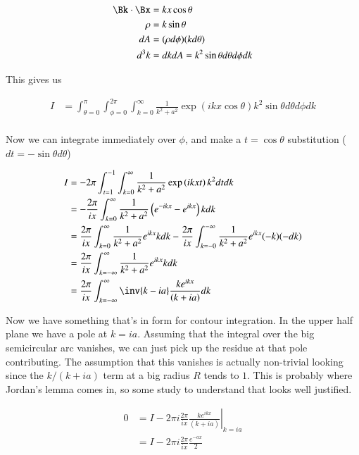 \begin{align*}
\Bk \cdot \Bx &= k x \cos\theta \\
\rho &= k \sin\theta \\
dA &= (\rho d\phi)(k d\theta) \\
d^3 k &= dk dA = k^2 \sin\theta d\theta d\phi dk \\
\end{align*}

This gives us

\begin{align*}
I &= \int_{\theta=0}^{\pi} \int_{\phi=0}^{2\pi} \int_{k=0}^\infty \frac{1}{k^2 + a^2} \exp\left( i k x \cos\theta \right)
k^2 \sin\theta d\theta d\phi dk \\
\end{align*}

Now we can integrate immediately over $\phi$, and make a $t = \cos\theta$ substitution ($dt = -\sin\theta d\theta$)

\begin{align*}
I
&= - 2\pi \int_{t=1}^{-1} \int_{k=0}^\infty \frac{1}{k^2 + a^2} \exp\left( i k x t \right) k^2 dt dk \\
&= - \frac{2\pi}{ix} \int_{k=0}^\infty \frac{1}{k^2 + a^2}
\left(
e^{-i k x } -e^{i k x }
\right)
k dk \\
&= \frac{2\pi}{ix} \int_{k=0}^\infty \frac{1}{k^2 + a^2}
e^{i k x }
k dk
- \frac{2\pi}{ix} \int_{k=-0}^{-\infty} \frac{1}{k^2 + a^2}
e^{i k x }
(-k) (-dk) \\
&= \frac{2\pi}{ix} \int_{k=-\infty}^\infty \frac{1}{k^2 + a^2} e^{i k x } k dk \\
&= \frac{2\pi}{ix} \int_{k=-\infty}^\infty \inv{k - ia} \frac{ k e^{ i k x } }{(k + ia)} dk \\
\end{align*}

Now we have something that's in form for contour integration.  In the upper half plane we have a pole at $k= ia$.  Assuming that the
integral over the big semicircular arc vanishes, we can just pick up the residue at that pole contributing.  The assumption that
this vanishes is actually non-trivial looking since the $k/(k+ia)$ term at a big radius $R$ tends to $1$.  This is probably where
Jordan's lemma comes in, so some study to understand that looks well justified.

\begin{align*}
0
&= I - 2 \pi i {\left. \frac{2\pi}{ix} \frac{ k e^{ i k x } }{(k + ia)} \right\vert}_{k= ia} \\
&= I - 2 \pi i \frac{2\pi}{ix} \frac{ e^{ - a x } }{2} \\
\end{align*}

